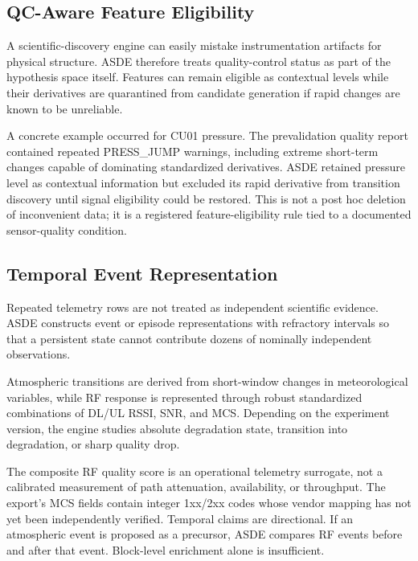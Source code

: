 \documentclass{ieeeaccess}
\begin{document}
\subsection{QC-Aware Feature Eligibility}\label{qc-aware-feature-eligibility}

A scientific-discovery engine can easily mistake instrumentation artifacts for physical structure. ASDE therefore treats quality-control status as part of the hypothesis space itself. Features can remain eligible as contextual levels while their derivatives are quarantined from candidate generation if rapid changes are known to be unreliable.

A concrete example occurred for CU01 pressure. The prevalidation quality report contained repeated PRESS\_\allowbreak JUMP warnings, including extreme short-term changes capable of dominating standardized derivatives. ASDE retained pressure level as contextual information but excluded its rapid derivative from transition discovery until signal eligibility could be restored. This is not a post hoc deletion of inconvenient data; it is a registered feature-eligibility rule tied to a documented sensor-quality condition.

\subsection{Temporal Event Representation}\label{temporal-event-representation}

Repeated telemetry rows are not treated as independent scientific evidence. ASDE constructs event or episode representations with refractory intervals so that a persistent state cannot contribute dozens of nominally independent observations.

Atmospheric transitions are derived from short-window changes in meteorological variables, while RF response is represented through robust standardized combinations of DL/UL RSSI, SNR, and MCS. Depending on the experiment version, the engine studies absolute degradation state, transition into degradation, or sharp quality drop.

The composite RF quality score is an operational telemetry surrogate, not a calibrated measurement of path attenuation, availability, or throughput. The export's MCS fields contain integer 1xx/2xx codes whose vendor mapping has not yet been independently verified. Temporal claims are directional. If an atmospheric event is proposed as a precursor, ASDE compares RF events before and after that event. Block-level enrichment alone is insufficient.
\end{document}
